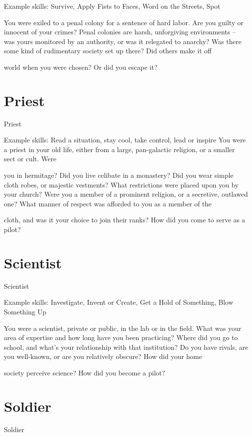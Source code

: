 Example skills: Survive, Apply Fists to Faces, Word on the Streets, Spot
 

You were exiled to a penal colony for a sentence of hard labor. Are you guilty or innocent of your crimes?  
Penal colonies are harsh, unforgiving environments -- was yours monitored by an authority, or was it  
relegated to anarchy? Was there some kind of rudimentary society set up there? Did others make it off  

world when you were chosen? Or did you escape it? 
 
\section{Priest}
                                                        Priest  

Example skills: Read a situation, stay cool, take control, lead or inspire  
You were a priest in your old life, either from a large, pan-galactic religion, or a smaller sect or cult. Were  

you in hermitage? Did you live celibate in a monastery? Did you wear simple cloth robes, or majestic  
vestments? What restrictions were placed upon you by your church? Were you a member of a prominent  
religion, or a secretive, outlawed one? What manner of respect was afforded to you as a member of the  

cloth, and was it your choice to join their ranks? How did you come to serve as a pilot?  

                                                                                                                      
\section{Scientist}

                                                     Scientist  

Example skills: Investigate, Invent or Create, Get a Hold of Something, Blow Something Up  

You were a scientist, private or public, in the lab or in the field. What was your area of expertise and how  
long have you been practicing? Where did you go to school, and what’s your relationship with that  
institution? Do you have rivals, are you well-known, or are you relatively obscure? How did your home  

society perceive science? How did you become a pilot?   
\section{Soldier}
                                                       Soldier  

